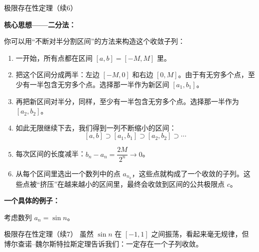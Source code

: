 \documentclass[aspectratio=169,10pt,fontset=fandol]{ctexbeamer}
\begin{document}
\begin{frame}[t,fragile]{极限存在性定理（续6）}
\footnotesize
{\footnotesize


\begin{center}
\end{center}

\textbf{核心思想——二分法：}

你可以用“不断对半分割区间”的方法来构造这个收敛子列：

\begin{enumerate}
\item 一开始，所有点都在区间 \([a, b] = [-M, M]\) 里。
\item 把这个区间分成两半：左边 \([-M, 0]\) 和右边 \([0, M]\)。由于有无穷多个点，至少有一半包含无穷多个点。选择那一半作为新区间 \([a_1, b_1]\)。
\item 再把新区间对半分，同样，至少有一半包含无穷多个点。选择那一半作为 \([a_2, b_2]\)。
\item 如此无限继续下去，我们得到一列不断缩小的区间：
\[
[a, b] \supset [a_1, b_1] \supset [a_2, b_2] \supset \cdots
\]
\item 每次区间的长度减半：\(b_n - a_n = \dfrac{2M}{2^n} \to 0\)。
\item 从每个区间里选出一个数列中的点 \(a_{n_k}\)，这些点就构成了一个收敛的子列。这些点被“挤压”在越来越小的区间里，最终会收敛到区间的公共极限点 \(c\)。
\end{enumerate}

\textbf{一个具体的例子：}

考虑数列 \(a_n = \sin n\)。
}
\end{frame}
\begin{frame}[t,fragile]{极限存在性定理（续7）}
\footnotesize
{\footnotesize
虽然 \(\sin n\) 在 \([-1, 1]\) 之间振荡，看起来毫无规律，但博尔查诺--魏尔斯特拉斯定理告诉我们：一定存在一个子列收敛。
}
\end{frame}
\end{document}
